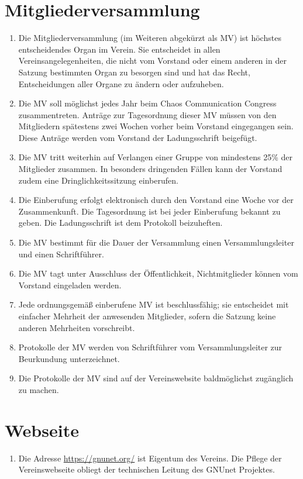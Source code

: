 \documentclass[german,a4paper]{article} %
\newenvironment{enumpar}{%
  \renewcommand{\labelenumi}{\theenumi}%
  \renewcommand{\theenumi}{(\arabic{enumi})}%
  \renewcommand{\labelenumii}{\theenumii}%
  \renewcommand{\theenumii}{(\alph{enumii})}%
  \begin{enumerate}}
{\end{enumerate}}
\begin{document}
\section{Mitgliederversammlung}
\label{Mitgliederversammlung}
\begin{enumpar}
\item Die Mitgliederversammlung (im Weiteren abgekürzt als \glqq MV\grqq ) ist höchstes entscheidendes Organ im Verein. Sie entscheidet in allen Vereinsangelegenheiten, die nicht vom Vorstand oder einem anderen in der Satzung bestimmten Organ zu besorgen sind und hat das Recht, Entscheidungen aller Organe zu ändern oder aufzuheben.
\item Die MV soll möglichst jedes Jahr beim Chaos Communication Congress zusammentreten. Anträge zur Tagesordnung dieser MV müssen von den Mitgliedern spätestens zwei Wochen vorher beim Vorstand eingegangen sein. Diese Anträge werden vom Vorstand der Ladungsschrift beigefügt.
\item Die MV tritt weiterhin auf Verlangen einer Gruppe von mindestens 25\% der Mitglieder zusammen. In besonders dringenden Fällen kann der Vorstand zudem eine Dringlichkeitssitzung einberufen.
\item Die Einberufung erfolgt elektronisch durch den Vorstand eine Woche vor der Zusammenkunft. Die Tagesordnung ist bei jeder Einberufung bekannt zu geben. Die Ladungsschrift ist dem Protokoll beizuheften.
\item Die MV bestimmt für die Dauer der Versammlung einen Versammlungsleiter und einen Schriftführer.
\item Die MV tagt unter Ausschluss der Öffentlichkeit, Nichtmitglieder können vom Vorstand eingeladen werden.
\item Jede ordnungsgemäß einberufene MV ist beschlussfähig; sie entscheidet mit einfacher Mehrheit der anwesenden Mitglieder, sofern die Satzung keine anderen Mehrheiten vorschreibt.
\item Protokolle der MV werden von Schriftführer vom Versammlungsleiter zur Beurkundung unterzeichnet.
\item Die Protokolle der MV sind auf der Vereinswebsite baldmöglichst zugänglich zu machen.
\end{enumpar}

\section{Webseite}
\label{Webseite}
\begin{enumpar}
\item Die Adresse \url{https://gnunet.org/} ist Eigentum des Vereins. Die Pflege der Vereinswebseite obliegt der technischen Leitung des GNUnet Projektes.
\end{enumpar}
\end{document}

